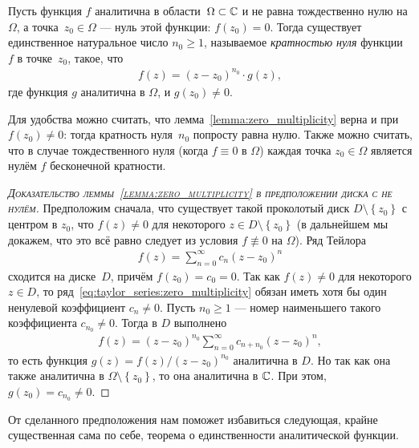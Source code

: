 \documentclass[../complex-analysis.tex]{subfiles}
\begin{document}
\begin{lm}
 \label{lemma:zero_multiplicity}
 Пусть функция $ f $  аналитична в области~$ \Omega \subset \mathbb{C} $ и не равна тождественно нулю на $ \Omega $, а точка~$ z_0 \in \Omega $ --- нуль этой функции: $ f(z_0) = 0 $. Тогда существует единственное натуральное число $ n_0 \geqslant 1 $, называемое \emph{кратностью нуля} функции~$ f $ в точке~$ z_0 $, такое, что
 \begin{align*}
  f(z) = (z - z_0)^{n_0} \cdot g(z),
 \end{align*} где функция $ g $ аналитична в $ \Omega $, и $ g(z_0) \neq 0 $.
\end{lm}
Для удобства можно считать, что лемма~\ref{lemma:zero_multiplicity} верна и при $ f(z_0) \neq 0 $: тогда кратность нуля~$ n_0 $ попросту равна нулю. Также можно считать, что в случае тождественного нуля (когда $ f \equiv 0 $ в $ \Omega $) каждая точка $ z_0 \in \Omega $ является нулём $ f $ бесконечной кратности.
\begin{proof}[\normalfont\textsc{Доказательство леммы~\ref{lemma:zero_multiplicity} в предположении диска с не нулём}]\item
 Предположим сначала, что существует такой проколотый диск $ D \setminus \left\{ z_0 \right\} $ с центром в $ z_0 $, что $ f(z) \neq 0 $ для некоторого $ z\in D \setminus \left\{ z_0 \right\} $ (в дальнейшем мы докажем, что это всё равно следует из условия $ f \not\equiv 0 $ на $ \Omega $). Ряд Тейлора
 \begin{align}
  \label{eq:taylor_series:zero_multiplicity}
  f(z) = \sum_{n=0}^{\infty}c_n(z-z_0)^{n}
 \end{align} сходится на диске~$ D $, причём $ f(z_0) = c_0 = 0 $. Так как $ f(z) \neq 0 $ для некоторого $ z \in D $, то ряд~\eqref{eq:taylor_series:zero_multiplicity} обязан иметь хотя бы один ненулевой коэффициент $ c_n \neq 0 $. Пусть  $ n_0 \geqslant 1 $  --- номер наименьшего такого коэффициента $ c_{n_0} \neq 0 $.  Тогда в $ D $ выполнено
 \begin{align*}
  f(z) = (z-z_0)^{n_0} \sum_{n=0}^{\infty} c_{n + n_0}(z-z_0)^{n},
 \end{align*} то есть функция $ g(z) = f(z) / (z-z_0)^{n_0} $ аналитична в $ D $. Но так как она также аналитична в $ \Omega \setminus \left\{ z_0 \right\} $, то она аналитична в $ \mathbb{C} $. При этом, $ g(z_0) = c_{n_0} \neq 0 $.
\end{proof}

От сделанного предположения нам поможет избавиться следующая, крайне существенная сама по себе, теорема о единственности аналитической функции.
\end{document}
